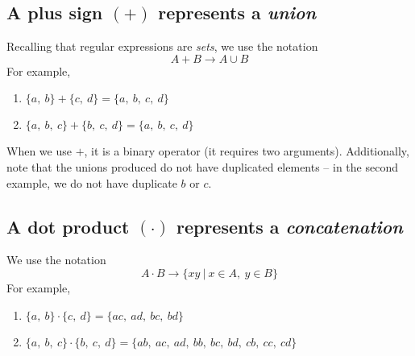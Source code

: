 \documentclass[12pt, leqno]{article} %
\begin{document}
\subsection{A plus sign $(+)$ represents a \emph{union}}

Recalling that regular expressions are \emph{sets}, we use the notation
\[
  A + B \longrightarrow A \cup B
\]
For example,

\begin{enumerate}
  \item $\{a,~b\} + \{c,~d\} = \{a,~b,~c,~d\}$
  \item $\{a,~b,~c\} + \{b,~c,~d\} = \{a,~b,~c,~d\}$
\end{enumerate}
When we use $+$, it is a binary operator (it requires two arguments).  Additionally, note that the unions
produced do not have duplicated elements -- in the second example, we do not have duplicate $b$ or $c$.

\subsection{A dot product $(\cdot)$ represents a \emph{concatenation}}

We use the notation
\[
  A \cdot B \longrightarrow \{xy~|~x\in A,~y \in B\}
\]
For example,

\begin{enumerate}
  \item $\{a,~b\}\cdot\{c,~d\} = \{ac,~ad,~bc,~bd\}$
  \item $\{a,~b,~c\}\cdot\{b,~c,~d\} = \{ab,~ac,~ad,~bb,~bc,~bd,~cb,~cc,~cd\}$
\end{enumerate}

%
%
\end{document}
